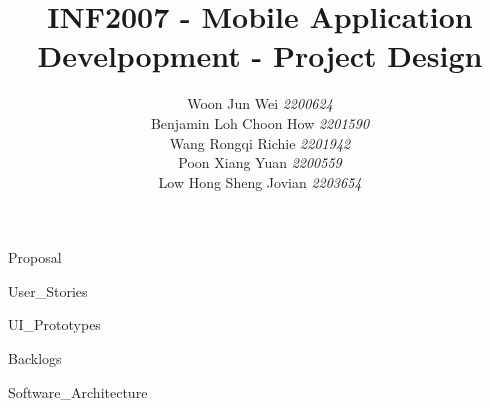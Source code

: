 \documentclass[a4paper, 11pt, notitlepage]{report}
\author{
        Woon Jun Wei \textit{2200624} \\
        Benjamin Loh Choon How \textit{2201590} \\
        Wang Rongqi Richie \textit{2201942} \\
        Poon Xiang Yuan \textit{2200559} \\
        Low Hong Sheng Jovian \textit{2203654}\\
    }
\title{
  INF2007 - Mobile Application Develpopment - Project Design 
}
\begin{document}
\maketitle


{Proposal}


{User_Stories}


{UI_Prototypes}


{Backlogs}


{Software_Architecture}




\newpage

%  
% 

\end{document}

